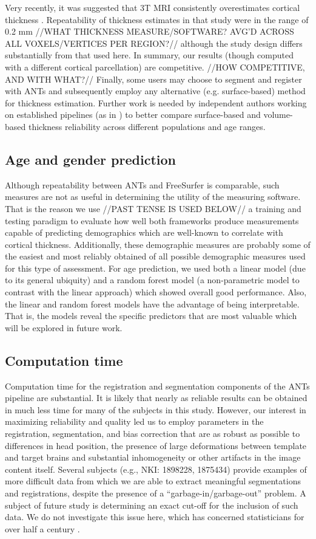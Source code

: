 Very recently, it was suggested that 3T MRI
consistently overestimates cortical thickness \cite{lusebrink2013}.
Repeatability of thickness estimates in that study were in the range
of 0.2 mm //WHAT THICKNESS MEASURE/SOFTWARE?
AVG'D ACROSS ALL VOXELS/VERTICES PER REGION?//
although the study design differs substantially from that used here.
In summary, our results (though computed
with a different cortical parcellation) are competitive.  //HOW COMPETITIVE, AND WITH WHAT?//
Finally, some users may choose to segment and register
with ANTs and subsequently employ any alternative (e.g. surface-based)
method for thickness estimation.  Further work is needed by
independent authors working on established pipelines (as in \cite{lusebrink2013,jovicich2013})
to better compare surface-based and volume-based thickness reliability
across different populations and age ranges. 

\subsection{Age and gender prediction} 
Although repeatability between ANTs and FreeSurfer is comparable,
such measures are not as useful in determining the utility of the 
measuring software.  That is the reason we use //PAST TENSE IS USED BELOW//
a training and testing paradigm to evaluate how well both frameworks produce measurements
capable of predicting demographics which are well-known to correlate
with cortical thickness.  Additionally, these demographic measures are
probably some of the easiest and most reliably obtained of all possible
demographic measures used for this type of assessment.  For age prediction,
we used both a linear model (due to its general ubiquity) and a random
forest model (a non-parametric model to contrast with the linear approach)
which showed overall good performance.  Also, the linear  and
random forest models have the advantage of being
interpretable.  That is, the models reveal the specific predictors
that are most valuable which will be explored in future work.  

\subsection{Computation time}
Computation time for the registration and segmentation components of
the ANTs pipeline are substantial.  It is likely that nearly as reliable
results can be obtained in much less time for many of the subjects in
this study.  However, our interest in
maximizing reliability and quality led us to employ parameters in the
registration, segmentation, and bias correction that are as robust as
possible to differences in head position, the presence of large
deformations between template and target brains and substantial
inhomogeneity or other artifacts in the image content itself.  Several
subjects (e.g., NKI: 1898228, 1875434) provide examples of more difficult
data from which we are able to
extract meaningful segmentations and registrations, despite the presence of a
``garbage-in/garbage-out'' problem.  A subject of future study is
determining an exact cut-off for the inclusion of such data.  We do not
investigate this issue here, which has concerned statisticians for over
half a century \cite{Hampel2001}. 

